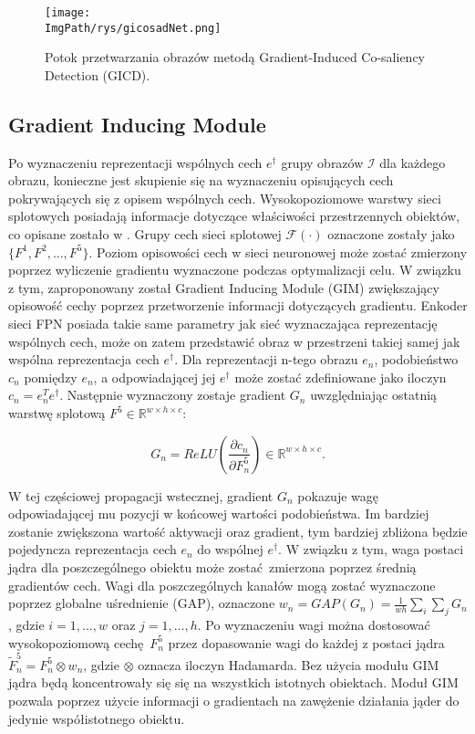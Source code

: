 \documentclass[a4paper,12pt,twoside,openany]{report}
\newcommand{\ImgPath}{.}
\begin{document}
\begin{figure}[h]
	\centering
	\texttt{[image: \\ImgPath/rys/gicosadNet.png]}
	\caption{Potok przetwarzania obrazów metodą Gradient-Induced Co-saliency Detection (GICD).}
	\label{GICDnet}
\end{figure}

\subsection{Gradient Inducing Module}
Po wyznaczeniu reprezentacji wspólnych cech $e^\dagger$ grupy obrazów $\mathcal{I}$ dla każdego obrazu, konieczne jest skupienie się na wyznaczeniu opisujących cech pokrywających się z opisem wspólnych cech. Wysokopoziomowe warstwy sieci splotowych posiadają informacje dotyczące właściwości przestrzennych obiektów, co opisane zostało w \cite{Selvaraju_2019}. Grupy cech sieci splotowej $\mathcal{F}(\cdot)$ oznaczone zostały jako $\{F^1, F^2, ..., F^5\}$. Poziom opisowości cech w sieci neuronowej może zostać zmierzony poprzez wyliczenie gradientu wyznaczone podczas optymalizacji celu. W związku z tym, zaproponowany został Gradient Inducing Module (GIM) zwiększający opisowość cechy poprzez przetworzenie informacji dotyczących gradientu. Enkoder sieci FPN posiada takie same parametry jak sieć wyznaczająca reprezentację wspólnych cech, może on zatem przedstawić obraz w przestrzeni takiej samej jak wspólna reprezentacja cech $e^\dagger$. Dla reprezentacji n-tego obrazu $e_n$, podobieństwo $c_n$ pomiędzy $e_n$, a odpowiadającej jej $e^\dagger$ może zostać zdefiniowane jako iloczyn $c_n = e_n^Te^\dagger$. Następnie wyznaczony zostaje gradient $G_n$ uwzględniając ostatnią warstwę splotową $F^5\in\mathds{R}^{w\times h\times c}$:

$$
 G_n = ReLU \left(\frac{\partial c_n}{\partial F^5_n}\right) \in \mathds{R}^{w\times h\times c}.
$$

W tej częściowej propagacji wstecznej, gradient $G_n$ pokazuje wagę odpowiadającej mu pozycji w końcowej wartości podobieństwa. Im bardziej zostanie zwiększona wartość aktywacji oraz gradient, tym bardziej zbliżona będzie pojedyncza reprezentacja cech $e_n$ do wspólnej $e^\dagger$. W związku z tym, waga postaci jądra dla poszczególnego obiektu może zostać zmierzona poprzez średnią gradientów cech. Wagi dla poszczególnych kanałów mogą zostać wyznaczone poprzez globalne uśrednienie (GAP), oznaczone $w_n = GAP(G_n) = \frac{1}{wh}\sum_i\sum_jG_n$, gdzie $i = 1, \dots, w$ oraz $j = 1, \dots, h$.  Po wyznaczeniu wagi można dostosować wysokopoziomową cechę $F_n^5$ przez dopasowanie wagi do każdej z postaci jądra $\tilde F_n^5 = F_n^5 \otimes w_n$, gdzie $\otimes$ oznacza iloczyn Hadamarda. Bez użycia modułu GIM jądra będą koncentrowały się się na wszystkich istotnych obiektach. Moduł GIM pozwala poprzez użycie informacji o gradientach na zawężenie działania jąder do jedynie współistotnego obiektu.
\end{document}
